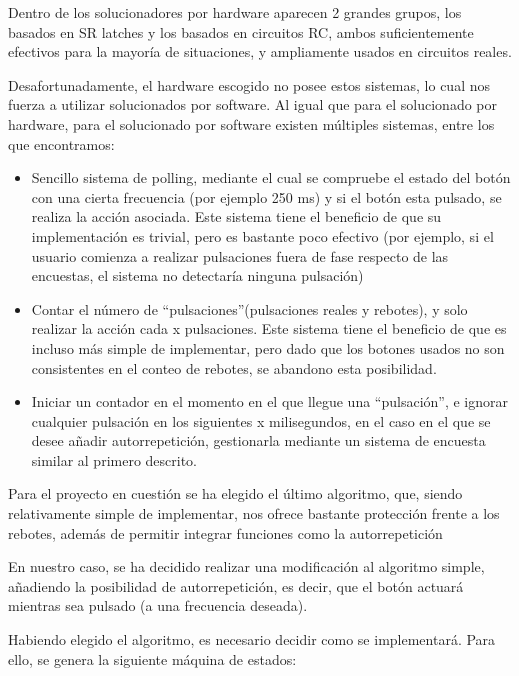 \documentclass[12pt,letterpaper]{article}
\begin{document}
Dentro de los solucionadores por hardware aparecen 2 grandes grupos,
los basados en SR latches y los basados en circuitos RC, ambos
suficientemente efectivos para la mayoría de situaciones, y
ampliamente usados en circuitos reales.

Desafortunadamente, el hardware escogido no posee estos sistemas, lo
cual nos fuerza a utilizar solucionados por software. Al igual que
para el solucionado por hardware, para el solucionado por software
existen múltiples sistemas, entre los que encontramos:
\begin{itemize}
  \item Sencillo sistema de polling, mediante el cual se compruebe el
    estado del botón con una cierta frecuencia (por ejemplo 250 ms) y
    si el botón esta pulsado, se realiza la acción asociada. Este
    sistema tiene el beneficio de que su implementación es trivial,
    pero es bastante poco efectivo (por ejemplo, si el usuario
    comienza a realizar pulsaciones fuera de fase respecto de las
    encuestas, el sistema no detectaría ninguna pulsación)
  \item Contar el número de ``pulsaciones''(pulsaciones reales y
    rebotes), y solo realizar la acción cada x pulsaciones. Este
    sistema tiene el beneficio de que es incluso más simple de
    implementar, pero dado que los botones usados no son consistentes
    en el conteo de rebotes, se abandono esta posibilidad.
  \item Iniciar un contador en el momento en el que llegue una
    ``pulsación'', e ignorar cualquier pulsación en los siguientes x
    milisegundos, en el caso en el que se desee añadir autorrepetición,
    gestionarla mediante un sistema de encuesta similar al primero
    descrito.
\end{itemize}

Para el proyecto en cuestión se ha elegido el último algoritmo, que,
siendo relativamente simple de implementar, nos ofrece bastante
protección frente a los rebotes, además de permitir integrar funciones
como la autorrepetición

En nuestro caso, se ha decidido realizar una modificación al algoritmo
simple, añadiendo la posibilidad de autorrepetición, es decir, que el
botón actuará mientras sea pulsado (a una frecuencia deseada).


Habiendo elegido el algoritmo, es necesario decidir como se
implementará. Para ello, se genera la siguiente máquina de estados:
\end{document}
